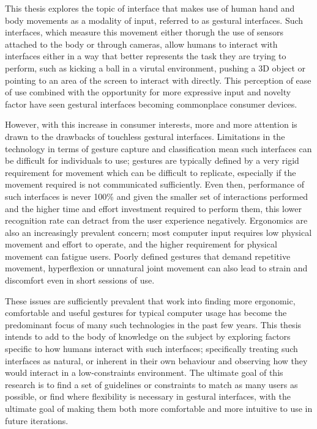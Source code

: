 \begin{todoenv}
This thesis explores the topic of interface that makes use of human hand and body movements as a modality of input, referred to as gestural interfaces. Such interfaces, which measure this movement either thorugh the use of sensors attached to the body or through cameras, allow humans to interact with interfaces either in a way that better represents the task they are trying to perform, such as kicking a ball in a virutal environment, pushing a 3D object or pointing to an area of the screen to interact with directly. This perception of ease of use combined with the opportunity for more expressive input and novelty factor have seen gestural interfaces becoming commonplace consumer devices.

However, with this increase in consumer interests, more and more attention is drawn to the drawbacks of touchless gestural interfaces. Limitations in the technology in terms of gesture capture and classification mean such interfaces can be difficult for individuals to use; gestures are typically defined by a very rigid requirement for movement which can be difficult to replicate, especially if the movement required is not communicated sufficiently. Even then, performance of such interfaces is never 100\% and given the smaller set of interactions performed and the higher time and effort investment required to perform them, this lower recognition rate can detract from the user experience negatively. Ergonomics are also an increasingly prevalent concern; most computer input requires low physical movement and effort to operate, and the higher requirement for physical movement can fatigue users. Poorly defined gestures that demand repetitive movement, hyperflexion or unnatural joint movement can also lead to strain and discomfort even in short sessions of use.

These issues are sufficiently prevalent that work into finding more ergonomic, comfortable and useful gestures for typical computer usage has become the predominant focus of many such technologies in the past few years. This thesis intends to add to the body of knowledge on the subject by exploring factors specific to how humans interact with such interfaces; specifically treating such interfaces as natural, or inherent in their own behaviour and observing how they would interact in a low-constraints environment. The ultimate goal of this research is to find a set of guidelines or constraints to match as many users as possible, or find where flexibility is necessary in gestural interfaces, with the ultimate goal of making them both more comfortable and more intuitive to use in future iterations.
\end{todoenv}

